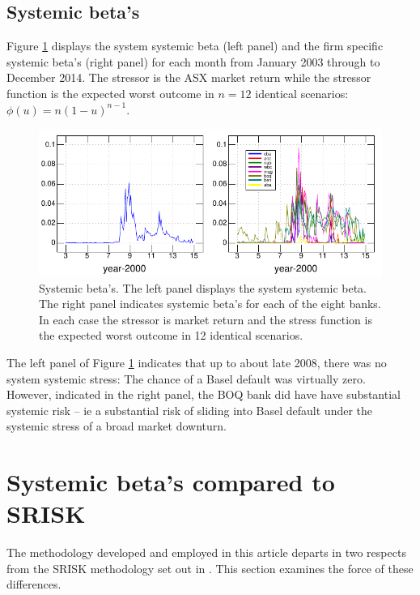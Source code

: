 \documentclass[authoryear]{elsarticle}
\newcommand{\fref}[1]{Figure \ref{#1}}
\begin{document}
\subsection{Systemic beta's}

\fref{Bbeta} displays the system systemic beta (left panel) and the firm specific systemic beta's (right panel)  for each month from January 2003 through to December 2014.   The stressor is the ASX market return while the stressor function is the expected worst outcome in $n=12$ identical scenarios:  $\phi(u)=n(1-u)^{n-1}$.

\begin{figure}[htbp]
\begin{center}
\includegraphics{Bbeta.pdf}
\caption{Systemic beta's.  The left panel displays the system systemic beta.   The right panel indicates systemic beta's for each of the eight banks.  In each case the stressor is market return and the stress function is the expected worst outcome in 12 identical scenarios.}
\label{Bbeta}
\end{center}
\end{figure}

The left panel of \fref{Bbeta} indicates that up to about late 2008, there was no system systemic stress:  The chance of a Basel default was virtually zero.   However, indicated in the right panel, the BOQ bank did have have substantial systemic risk -- ie a substantial risk of sliding into Basel default under the systemic stress of a broad market downturn.

\section{Systemic beta's  compared to SRISK}

The methodology developed and employed in this article departs in two respects from the SRISK methodology set out in \cite{brownlees2015}.  This section examines the force of these differences.
\end{document}
